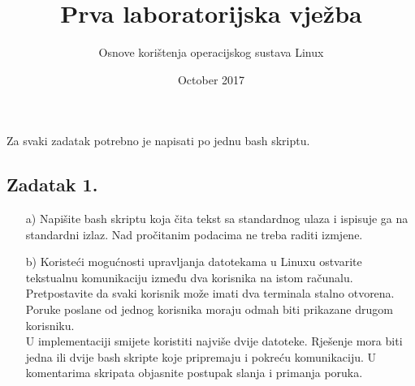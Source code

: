 \documentclass{exam}
\title{Prva laboratorijska vježba}
\author{Osnove korištenja operacijskog sustava Linux}
\date{October 2017}
\begin{document}
      \maketitle
      Za svaki zadatak potrebno je napisati po jednu bash skriptu.
      \subsection*{Zadatak 1.}
        \begin{itemize}
                        \item[a)] Napišite bash skriptu koja čita tekst sa
                            standardnog ulaza i ispisuje ga na standardni izlaz.
                            Nad pročitanim podacima ne treba raditi izmjene.
                                    \item[b)] Koristeći mogućnosti upravljanja
                                        datotekama u Linuxu ostvarite tekstualnu
                                        komunikaciju između dva korisnika na
                                        istom računalu. Pretpostavite da svaki
                                        korisnik može imati dva terminala stalno
                                        otvorena. Poruke poslane od jednog
                                        korisnika moraju odmah biti prikazane
                                        drugom korisniku.\\
                                                U implementaciji smijete
                                                koristiti najviše dvije
                                                datoteke. Rješenje mora biti
                                                jedna ili dvije bash skripte
                                                koje pripremaju i pokreću
                                                komunikaciju. U komentarima
                                                skripata objasnite postupak
                                                slanja i primanja poruka.
        \end{itemize}
\end{document}
